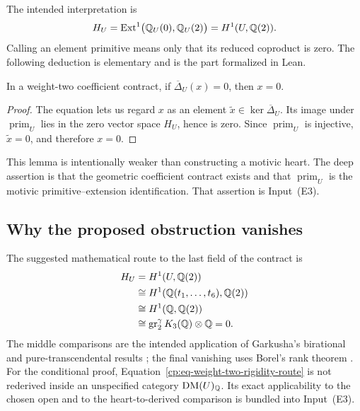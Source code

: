 The intended interpretation is
\[
 H_U=
 \operatorname{Ext}^1\bigl(\mathbb Q_U(0),\mathbb Q_U(2)\bigr)
 =H^1(U,\mathbb Q(2)).
\]
Calling an element primitive means only that its reduced coproduct is zero.
The following deduction is elementary and is the part formalized in Lean.

\begin{lemma}
\label{cp:lem-three-level-framed}
In a weight-two coefficient contract, if
\(\overline\Delta_U(x)=0\), then \(x=0\).
\end{lemma}

\begin{proof}
The equation lets us regard \(x\) as an element
\(\widetilde x\in\ker\overline\Delta_U\).  Its image under
\(\operatorname{prim}_U\) lies in the zero vector space \(H_U\), hence is
zero.  Since \(\operatorname{prim}_U\) is injective, \(\widetilde x=0\), and
therefore \(x=0\).
\end{proof}

This lemma is intentionally weaker than constructing a motivic heart.  The
deep assertion is that the geometric coefficient contract exists and that
\(\operatorname{prim}_U\) is the motivic primitive--extension
identification.  That assertion is Input~\textup{(E3)}.

\subsection{Why the proposed obstruction vanishes}

The suggested mathematical route to the last field of the contract is
\begin{equation}
\begin{split}
 H_U
 &=H^1(U,\mathbb Q(2))\\
 &\cong H^1(\mathbb Q(t_1,\ldots,t_6),\mathbb Q(2))\\
 &\cong H^1(\mathbb Q,\mathbb Q(2))\\
 &\cong\operatorname{gr}_2^\gamma K_3(\mathbb Q)\otimes\mathbb Q=0.
\end{split}
\label{cp:eq-weight-two-rigidity-route}
\end{equation}
The middle comparisons are the intended application of Garkusha's
birational and pure-transcendental results \cite{Garkusha2023}; the final
vanishing uses Borel's rank theorem \cite{Borel1977}.  For the conditional
proof, Equation~\eqref{cp:eq-weight-two-rigidity-route} is not rederived
inside an unspecified category \(\operatorname{DM}(U)_\mathbb Q\).  Its exact applicability to
the chosen open and to the heart-to-derived comparison is bundled into
Input~\textup{(E3)}.

